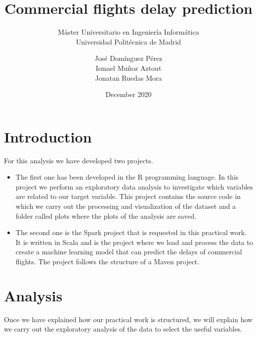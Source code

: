 

\title{Commercial flights delay prediction}
\subtitle{Máster Universitario en Ingeniería Informática\\
		  Universidad Politécnica de Madrid}
\author{José Domínguez Pérez\\
		Ismael Muñoz Aztout\\
		Jonatan Ruedas Mora}
\date{December 2020}

\makeindex

\maketitle
\tableofcontents
\newpage

\section{Introduction}

For this analysis we have developed two projects.

\begin{itemize}

	\item The first one has been developed in the R programming language. In this project we perform an exploratory data analysis to investigate which variables are related to our target variable. This project contains the source code in which we carry out the processing and visualization of the dataset and a folder called plots where the plots of the analysis are saved.

	\item The second one is the Spark project that is requested in this practical work. It is written in Scala and is the project where we load and process the data to create a machine learning model that can predict the delays of commercial flights. The project follows the structure of a Maven project.
	
\end{itemize}

\section{Analysis}

Once we have explained how our practical work is structured, we will explain how we carry out the exploratory analysis of the data to select the useful variables.\\

